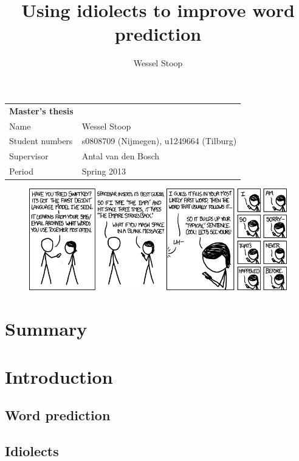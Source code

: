 \documentclass[12pt]{article}
\title{Using idiolects to improve word prediction}
\author{Wessel Stoop}
\let\stdsection\section
\renewcommand\section{\newpage\stdsection}
\begin{document}
\begin{table}[b]
\begin{tabular}{ll}
\textbf{Master's thesis}&\\
Name&Wessel Stoop\\
Student numbers&s0808709 (Nijmegen), u1249664 (Tilburg)\\
Supervisor&Antal van den Bosch\\
Period&Spring 2013\\
\end{tabular}
\end{table}

\maketitle

\begin{figure}
\includegraphics[scale=0.5]{swiftkey}
\end{figure}

\clearpage

\tableofcontents

\section{Summary}

\section{Introduction}

\subsection{Word prediction}


\subsection{Idiolects}
\end{document}
